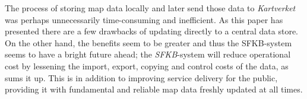 


The process of storing map data locally and later send those data to \textit{Kartverket} was perhaps unnecessarily time-consuming and inefficient. As this paper has presented there are a few drawbacks of updating directly to a central data store. On the other hand, the benefits seem to be greater and thus the SFKB-system seems to have a bright future ahead; the \textit{SFKB}-system will reduce operational cost by lessening the import, export, copying and control costs of the data, as \cite{Kartverket2017e} sums it up.  This is in addition to improving service delivery for the public, providing it with fundamental and reliable map data freshly updated at all times. 
